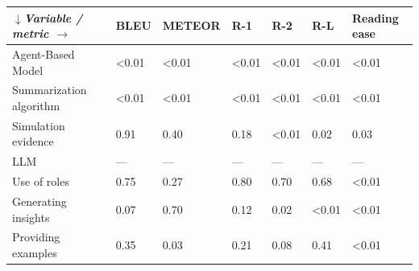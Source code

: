 \begin{tabular}{|l|l|l|l|l|l|l|}
\hline
\textit{$\downarrow$Variable / metric $\rightarrow$} & BLEU & METEOR & R-1 & R-2 & R-L & Reading ease \\
 \hline
 Agent-Based Model & \textless{}0.01 & \textless{}0.01 & \textless{}0.01 & \textless{}0.01 & \textless{}0.01 & \textless{}0.01 \\
 \hline
 Summarization algorithm & \textless{}0.01 & \textless{}0.01 & \textless{}0.01 & \textless{}0.01 & \textless{}0.01 & \textless{}0.01 \\
 \hline
 Simulation evidence & 0.91 & 0.40 & 0.18 & \textless{}0.01 & 0.02 & 0.03 \\
 \hline
 LLM & — & — & — & — & — & — \\
 \hline
 Use of roles & 0.75 & 0.27 & 0.80 & 0.70 & 0.68 & \textless{}0.01 \\
 \hline
 Generating insights & 0.07 & 0.70 & 0.12 & 0.02 & \textless{}0.01 & \textless{}0.01 \\
 \hline
 Providing examples & 0.35 & 0.03 & 0.21 & 0.08 & 0.41 & \textless{}0.01 \\
\hline
\end{tabular}
